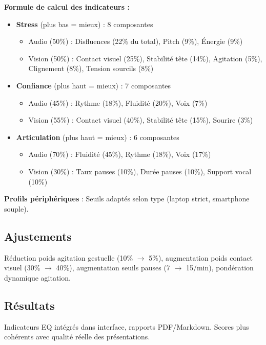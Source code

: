 \documentclass[12pt,a4paper]{article}
\begin{document}
\textbf{Formule de calcul des indicateurs :}

\begin{itemize}
    \item \textbf{Stress} (plus bas = mieux) : 8 composantes
    \begin{itemize}
        \item Audio (50\%) : Disfluences (22\% du total), Pitch (9\%), Énergie (9\%)
        \item Vision (50\%) : Contact visuel (25\%), Stabilité tête (14\%), Agitation (5\%), Clignement (8\%), Tension sourcils (8\%)
    \end{itemize}
    \item \textbf{Confiance} (plus haut = mieux) : 7 composantes
    \begin{itemize}
        \item Audio (45\%) : Rythme (18\%), Fluidité (20\%), Voix (7\%)
        \item Vision (55\%) : Contact visuel (40\%), Stabilité tête (15\%), Sourire (3\%)
    \end{itemize}
    \item \textbf{Articulation} (plus haut = mieux) : 6 composantes
    \begin{itemize}
        \item Audio (70\%) : Fluidité (45\%), Rythme (18\%), Voix (17\%)
        \item Vision (30\%) : Taux pauses (10\%), Durée pauses (10\%), Support vocal (10\%)
    \end{itemize}
\end{itemize}

\textbf{Profils périphériques} : Seuils adaptés selon type (laptop strict, smartphone souple).

\subsection{Ajustements}
Réduction poids agitation gestuelle (10\% $\rightarrow$ 5\%), augmentation poids contact visuel (30\% $\rightarrow$ 40\%), augmentation seuils pauses (7 $\rightarrow$ 15/min), pondération dynamique agitation.

\subsection{Résultats}
Indicateurs EQ intégrés dans interface, rapports PDF/Markdown. Scores plus cohérents avec qualité réelle des présentations.
\end{document}
